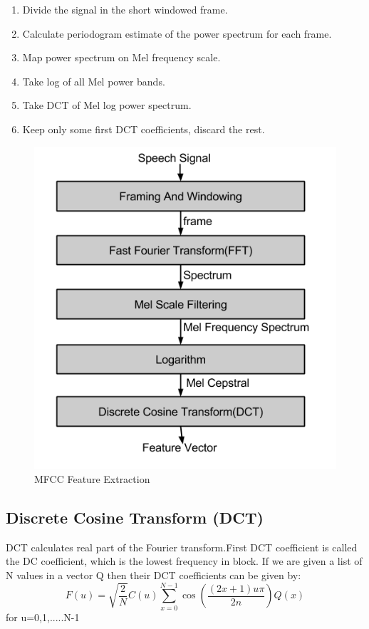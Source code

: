 \documentclass[11pt]{report}
\begin{document}
\begin{enumerate}
\item Divide the signal in the short windowed frame.
\item Calculate periodogram estimate of the power spectrum for each frame.
\item Map power spectrum on Mel frequency scale.
\item Take log of all Mel power bands.
\item Take DCT of Mel log power spectrum. 
\item Keep only some first DCT coefficients, discard the rest.
\end{enumerate}
\begin{figure}[h]
\centering
\includegraphics[scale=.6]{./images/mfcc.png}
\caption{MFCC Feature Extraction}

\end{figure}


\subsection{Discrete Cosine Transform (DCT)}
DCT calculates real part of the Fourier transform.First DCT coefficient is called the DC coefficient, which is the lowest frequency in block. If we are given a list of N values in a vector Q then their DCT coefficients can be given by:
\begin{equation}
F(u)=\sqrt{\frac{2}{N}} C(u) \sum\limits_{x=0}^{N-1} \cos(\frac{(2x+1)u\pi}{2n})Q(x)
\end{equation}
for u=0,1,.....N-1
\end{document}
